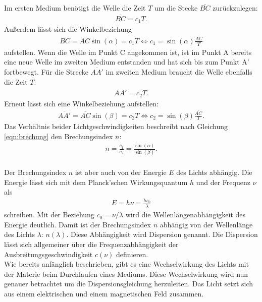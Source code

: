 Im ersten Medium benötigt die Welle die Zeit $T$ um die Stecke $\overline{BC}$ zurückzulegen:
\begin{align*}
  \overline{BC}= c_{\text{1}} T.
\end{align*}
Außerdem lässt sich die Winkelbeziehung
\begin{align*}
  \overline{BC} =\overline{AC} \sin{(\alpha)} = c_{\text{1}} T \Leftrightarrow  c_{\text{1}} = \sin{(\alpha)} \frac{\overline{AC}}{T}
\end{align*}
aufstellen.
Wenn die Welle im Punkt C angekommen ist, ist im Punkt A bereits eine neue Welle im zweiten Medium entstanden und hat sich bis zum Punkt A' fortbewegt.
Für die Strecke $\overline{A A'}$ im zweiten Medium braucht die Welle ebenfalls die Zeit $T$:
\begin{align*}
  \overline{AA'}= c_{\text{2}} T.
\end{align*}
Erneut lässt sich eine Winkelbeziehung aufstellen:
\begin{align*}
  \overline{AA'}= \overline{AC} \sin{(\beta)} = c_{\text{2}} T \Leftrightarrow c_{\text{2}} = \sin{(\beta)} \frac{\overline{AC}}{T}.
\end{align*}
Das Verhältnis beider Lichtgeschwindigkeiten beschreibt nach Gleichung \eqref{eqn:brechung} den Brechungsindex $n$:
\begin{align}
  n=\frac{c_{\text{1}}}{c_{\text{2}}} = \frac{\sin{(\alpha)}}{\sin{(\beta)}}.
  \label{eqn:brechungsindex}
\end{align}
\\Der Brechungsindex $n$ ist aber auch von der Energie $E$ des Lichts abhängig.
Die Energie lässt sich mit dem Planck'schen Wirkungsquantum $h$ und der Frequenz $\nu$ als
\begin{align*}
  E= h \nu = \frac{h c_{\text{0}}}{\lambda}
\end{align*}
schreiben.
Mit der Beziehung $c_{\text{0}}=\nu/\lambda$ wird die Wellenlängenabhängigkeit des Energie deutlich.
Damit ist der Brechungsindex $n$ abhängig von der Wellenlänge des Lichts $\lambda$: $n(\lambda)$.
Diese Abhängigkeit wird Dispersion genannt.
Die Dispersion lässt sich allgemeiner über die Frequenzabhängigkeit der Ausbreitungsgeschwindigkeit $c(\nu)$ definieren.
\\Wie bereits anfänglich beschrieben, gibt es eine Wechselwirkung des Lichts mit der Materie beim Durchlaufen eines Mediums.
Diese Wechselwirkung wird nun genauer betrachtet um die Dispersionsgleichung herzuleiten.
Das Licht setzt sich aus einem elektrischen und einem magnetischen Feld zusammen.
